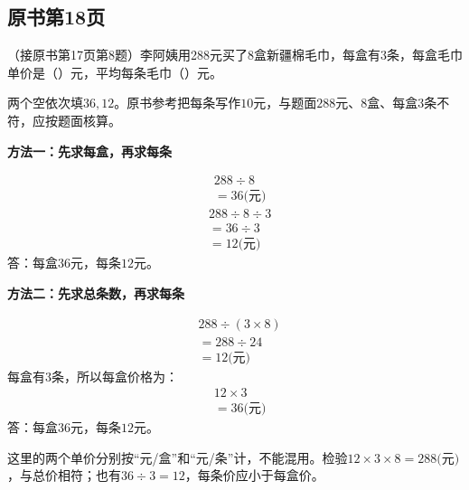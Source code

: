 

\subsection*{原书第18页}

（接原书第17页第8题）李阿姨用288元买了8盒新疆棉毛巾，每盒有3条，每盒毛巾单价是（\hspace{1.8em}）元，平均每条毛巾（\hspace{1.8em}）元。\par
\begin{BookAnswer}
两个空依次填\(36,12\)。原书参考把每条写作\(10\)元，与题面\(288\)元、\(8\)盒、每盒\(3\)条不符，应按题面核算。\par \noindent\begin{minipage}{\linewidth}\textbf{方法一：先求每盒，再求每条}\par \[\begin{aligned}&288\div8\\&=36\text{(元)}\end{aligned}\]\[\begin{aligned}&288\div8\div3\\&=36\div3\\&=12\text{(元)}\end{aligned}\]答：每盒\(36\)元，每条\(12\)元。\end{minipage}\par \noindent\begin{minipage}{\linewidth}\textbf{方法二：先求总条数，再求每条}\par \[\begin{aligned}&288\div(3\times8)\\&=288\div24\\&=12\text{(元)}\end{aligned}\]每盒有\(3\)条，所以每盒价格为：\[\begin{aligned}&12\times3\\&=36\text{(元)}\end{aligned}\]答：每盒\(36\)元，每条\(12\)元。\end{minipage}\par \par 这里的两个单价分别按“元/盒”和“元/条”计，不能混用。检验\(12\times3\times8=288\text{(元)}\)，与总价相符；也有\(36\div3=12\)，每条价应小于每盒价。
\end{BookAnswer}

